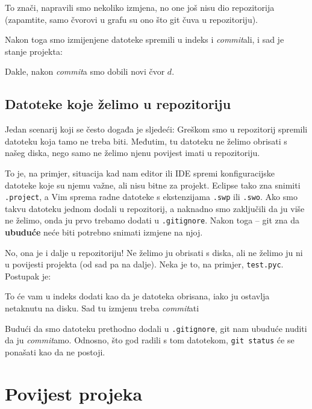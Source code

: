 To znači, napravili smo nekoliko izmjena, no one još nisu dio repozitorija (zapamtite, samo čvorovi u grafu su ono što git čuva u repozitoriju).

Nakon toga smo izmijenjene datoteke spremili u indeks i \emph{commit}ali, i sad je stanje projekta:



Dakle, nakon \emph{commit}a smo dobili novi čvor $d$.

\subsection*{Datoteke koje želimo u repozitoriju}

Jedan scenarij koji se često događa je sljedeći:
Greškom smo u repozitorij spremili datoteku koja tamo ne treba biti. 
Međutim, tu datoteku ne želimo obrisati s našeg diska, nego samo ne želimo njenu povijest imati u repozitoriju.

To je, na primjer, situacija kad nam editor ili IDE spremi konfiguracijske datoteke koje su njemu važne, ali nisu bitne za projekt.
Eclipse tako zna snimiti \verb+.project+, a Vim sprema radne datoteke s ekstenzijama \verb+.swp+ ili \verb+.swo+.
Ako smo takvu datoteku jednom dodali u repozitorij, a naknadno smo zaključili da ju više ne želimo, onda ju prvo trebamo dodati u \verb+.gitignore+.
Nakon toga -- git zna da \textbf{ubuduće} neće biti potrebno snimati izmjene na njoj.

No, ona je i dalje u repozitoriju!
Ne želimo ju obrisati s diska, ali ne želimo ju ni u povijesti projekta (od sad pa na dalje).
Neka je to, na primjer, \verb+test.pyc+.
Postupak je:


To će vam u indeks dodati kao da je datoteka obrisana, iako ju ostavlja netaknutu na disku.
Sad tu izmjenu treba \emph{commit}ati

Budući da smo datoteku prethodno dodali u \verb+.gitignore+, git nam ubuduće nuditi da ju \emph{commit}amo.
Odnosno, što god radili s tom datotekom, \verb+git status+ će se ponašati kao da ne postoji.

\section*{Povijest projeka}

